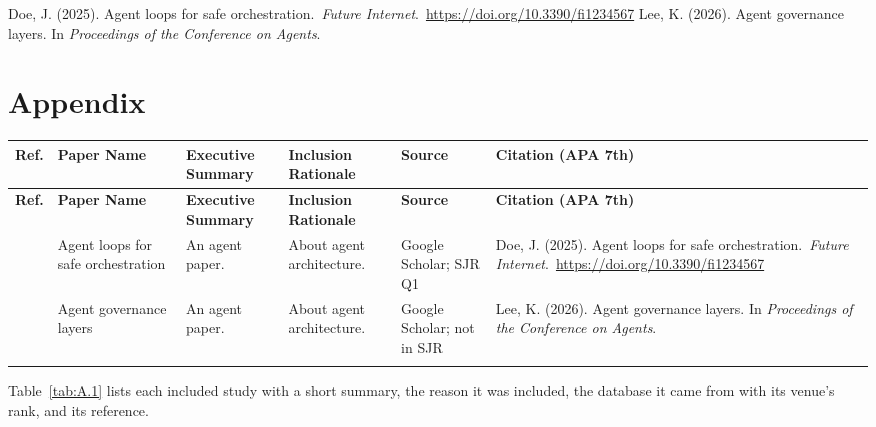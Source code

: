 \documentclass[10pt,a4paper]{article}
\begin{document}
\clearpage
\begin{thebibliography}{99}
 Doe, J. (2025). Agent loops for safe orchestration.\ \textit{Future Internet}.\ \url{https://doi.org/10.3390/fi1234567}
 Lee, K. (2026). Agent governance layers. In \textit{Proceedings of the Conference on Agents}.
\end{thebibliography}

\clearpage
\section*{Appendix}\label{sec:appendix}
\setcounter{table}{0}
\renewcommand{\thetable}{A.\arabic{table}}
\renewcommand{\theHtable}{A.\arabic{table}} %

\small
\begin{tabularx}{\textwidth}{>{\hsize}Y >{\hsize}Y >{\hsize}Y >{\hsize}Y >{\hsize}Y >{\hsize}Y}
\caption{Included studies}\label{tab:A.1}\\
\toprule
\textbf{Ref.} & \textbf{Paper Name} & \textbf{Executive Summary} & \textbf{Inclusion Rationale} & \textbf{Source} & \textbf{Citation (APA 7th)} \\
\midrule
\endfirsthead%
\toprule
\textbf{Ref.} & \textbf{Paper Name} & \textbf{Executive Summary} & \textbf{Inclusion Rationale} & \textbf{Source} & \textbf{Citation (APA 7th)} \\
\midrule
\endhead%
{\cite{doe2025agent}} & Agent loops for safe orchestration & An agent paper. & About agent architecture. & Google Scholar; SJR Q1 & Doe, J. (2025). Agent loops for safe orchestration.\ \textit{Future Internet}.\ \url{https://doi.org/10.3390/fi1234567}\\ \addlinespace
{\cite{lee2026agent}} & Agent governance layers & An agent paper. & About agent architecture. & Google Scholar; not in SJR & Lee, K. (2026). Agent governance layers. In \textit{Proceedings of the Conference on Agents}.\\ \addlinespace
\bottomrule
\end{tabularx}
\vspace{4pt}\noindent Table~\ref{tab:A.1} lists each included study with a short summary, the reason it was included, the database it came from with its venue's rank, and its reference.\par
{}
\end{document}
